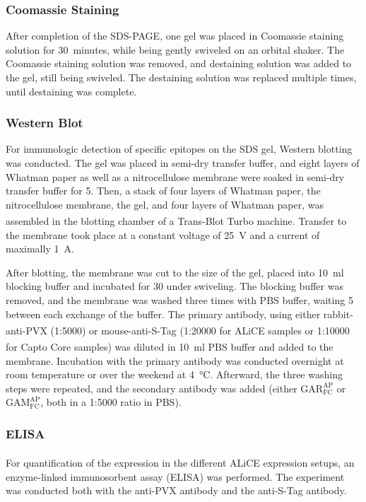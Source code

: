 \subsubsection{Coomassie Staining}
After completion of the SDS-PAGE, one gel was placed in Coomassie staining solution for 30~minutes, while being gently swiveled on an orbital shaker. The Coomassie staining solution was removed, and destaining solution was added to the gel, still being swiveled. The destaining solution was replaced multiple times, until destaining was complete. 

\subsubsection{Western Blot}
For immunologic detection of specific epitopes on the SDS gel, Western blotting was conducted. The gel was placed in semi-dry transfer buffer, and eight layers of Whatman paper as well as a nitrocellulose membrane were soaked in semi-dry transfer buffer for \SI{5}{\min}. Then, a stack of four layers of Whatman paper, the nitrocellulose membrane, the gel, and four layers of Whatman paper, was assembled in the blotting chamber of a Trans-Blot\textsuperscript{\textregistered} Turbo\textsuperscript{\texttrademark} machine. Transfer to the membrane took place at a constant voltage of \SI{25}{\volt} and a current of maximally \SI{1}{\ampere}.

After blotting, the membrane was cut to the size of the gel, placed into \SI{10}{\milli\litre} blocking buffer and incubated for \SI{30}{\min} under swiveling. The blocking buffer was removed, and the membrane was washed three times with PBS buffer, waiting \SI{5}{\min} between each exchange of the buffer. The primary antibody, using either rabbit-anti-PVX (1:5000) or mouse-anti-S-Tag (1:20000 for ALiCE\textsuperscript{\textregistered} samples or 1:10000 for Capto\textsuperscript{\texttrademark} Core samples) was diluted in \SI{10}{\milli\litre} PBS buffer and added to the membrane. Incubation with the primary antibody was conducted overnight at room temperature or over the weekend at \SI{4}{\degreeCelsius}. Afterward, the three washing steps were repeated, and the secondary antibody was added (either $\mathrm{GAR}_{\mathrm{FC}}^{\mathrm{AP}}$ or $\mathrm{GAM}_{\mathrm{FC}}^{\mathrm{AP}}$, both in a 1:5000 ratio in PBS). 

\subsubsection{ELISA}
For quantification of the expression in the different ALiCE\textsuperscript{\textregistered} expression setups, an enzyme-linked immunosorbent assay (ELISA) was performed. The experiment was conducted both with the anti-PVX antibody and the anti-S-Tag antibody. 

